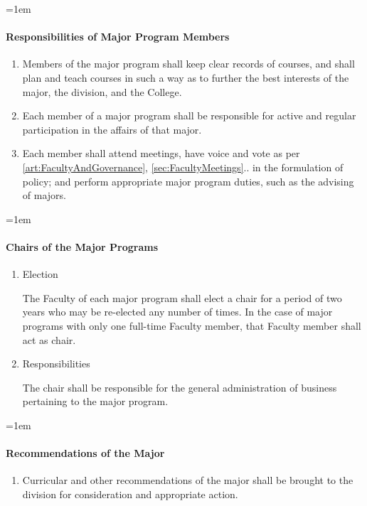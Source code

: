 \documentclass{manual}
\let\oldparagraph\paragraph
\renewcommand\paragraph{\leftskip=1em\oldparagraph}
\newcommand{\itemLevelA}{\alph*.}
\newcommand{\itemRefA}{\alph*}
\begin{document}
\paragraph{Responsibilities of Major Program Members}
\begin{enumerate}[label=\itemLevelA,ref=\itemRefA]
\item Members of the major program shall keep clear records of courses, and shall plan and teach courses in such a way as to further the best interests of the major, the division, and the College.
\item Each member of a major program shall be responsible for active and regular participation in the affairs of that major.
\item Each member shall attend meetings, have voice and vote as per \cref{art:FacultyAndGovernance}, \cref{sec:FacultyMeetings}.. in the formulation of policy; and perform appropriate major program duties, such as the advising of majors.
\end{enumerate}

\paragraph{Chairs of the Major Programs}
\begin{enumerate}[label=\itemLevelA,ref=\itemRefA]
\item Election

The Faculty of each major program shall elect a chair for a period of two years who may be re-elected any number of times. In the case of major programs with only one full-time Faculty member, that Faculty member shall act as chair.
\item Responsibilities

The chair shall be responsible for the general administration of business pertaining to the major program.
\end{enumerate}

\paragraph{Recommendations of the Major}
\begin{enumerate}[label=\itemLevelA,ref=\itemRefA]
\item Curricular and other recommendations of the major shall be brought to the division for consideration and appropriate action.
\end{enumerate}
\end{document}
